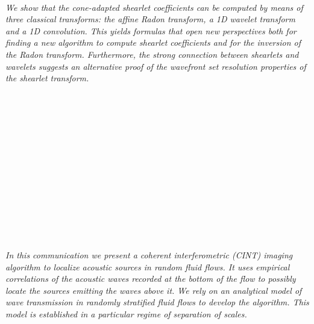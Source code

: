 \begin{multicols}{2}
\\ 
      \\
      \\\\
      \\
      \\\\
      \\
      \\\\
\\
    \textit{We show that the cone-adapted shearlet coefficients can be computed by means of three classical transforms: the affine Radon transform, a 1D wavelet transform and a 1D convolution. This yields formulas that open new perspectives both for finding a new algorithm to compute shearlet coefficients and for the inversion of the Radon transform. Furthermore, the strong connection between shearlets and wavelets suggests an alternative proof of the wavefront set resolution properties of the shearlet transform. }\\
\\ 
      \\
      \\\\
      \\
      \\\\
      \\
      \\\\
      \\
      \\\\
\\
    \textit{In this communication we present a coherent interferometric (CINT) imaging algorithm to localize acoustic sources in random fluid flows. It uses empirical correlations of the acoustic waves recorded at the bottom of the flow to possibly locate the sources emitting the waves above it. We rely on an analytical model of wave transmission in randomly stratified fluid flows to develop the algorithm. This model is established in a particular regime of separation of scales.}\\

\end{multicols}

